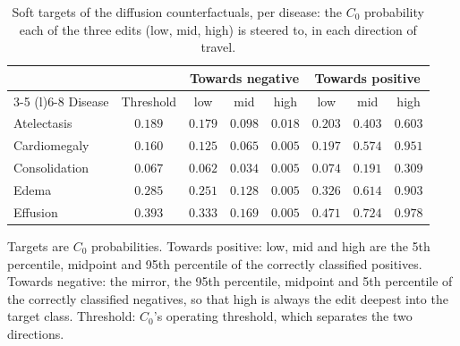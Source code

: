 \begin{table}[htbp]
\centering
\small
\caption{Soft targets of the diffusion counterfactuals, per disease: the $C_0$ probability each of the three edits (low, mid, high) is steered to, in each direction of travel.}
\label{tab:diffusion_soft_targets}
\begin{threeparttable}
\begin{tabular}{lc|ccc|ccc}
\toprule
& & \multicolumn{3}{c|}{Towards negative} & \multicolumn{3}{c}{Towards positive} \\
\cmidrule(lr){3-5} \cmidrule(l){6-8}
Disease & Threshold & low & mid & high & low & mid & high \\
\midrule
Atelectasis & $0.189$ & $0.179$ & $0.098$ & $0.018$ & $0.203$ & $0.403$ & $0.603$ \\
Cardiomegaly & $0.160$ & $0.125$ & $0.065$ & $0.005$ & $0.197$ & $0.574$ & $0.951$ \\
Consolidation & $0.067$ & $0.062$ & $0.034$ & $0.005$ & $0.074$ & $0.191$ & $0.309$ \\
Edema & $0.285$ & $0.251$ & $0.128$ & $0.005$ & $0.326$ & $0.614$ & $0.903$ \\
Effusion & $0.393$ & $0.333$ & $0.169$ & $0.005$ & $0.471$ & $0.724$ & $0.978$ \\
\bottomrule
\end{tabular}
\begin{tablenotes}\footnotesize
\item Targets are $C_0$ probabilities. Towards positive: low, mid and high are the 5th percentile, midpoint and 95th percentile of the correctly classified positives. Towards negative: the mirror, the 95th percentile, midpoint and 5th percentile of the correctly classified negatives, so that high is always the edit deepest into the target class. Threshold: $C_0$'s operating threshold, which separates the two directions.
\end{tablenotes}
\end{threeparttable}
\end{table}
